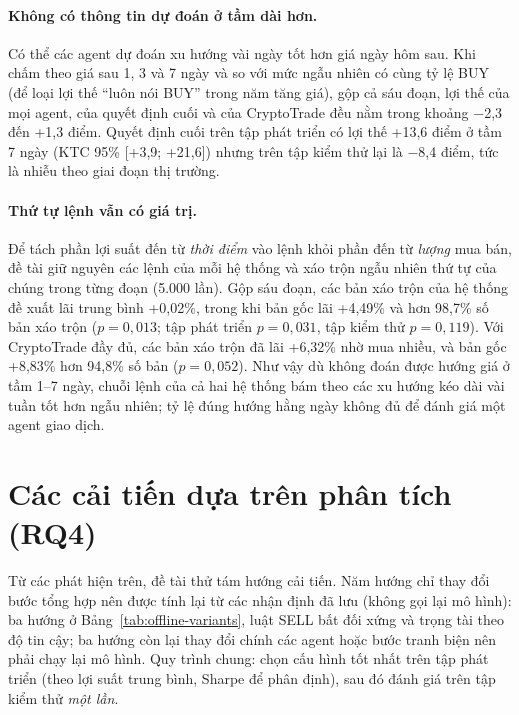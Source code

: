 \paragraph{Không có thông tin dự đoán ở tầm dài hơn.} Có thể các agent dự đoán xu hướng vài ngày tốt hơn giá ngày hôm
sau. Khi chấm theo giá sau 1, 3 và 7 ngày và so với mức ngẫu nhiên có cùng tỷ lệ BUY (để loại lợi thế ``luôn nói BUY''
trong năm tăng giá), gộp cả sáu đoạn, lợi thế của mọi agent, của quyết định cuối và của CryptoTrade đều nằm trong khoảng
$-$2,3 đến +1,3 điểm. Quyết định cuối trên tập phát triển có lợi thế +13,6 điểm ở tầm 7 ngày (KTC 95\% [+3,9; +21,6])
nhưng trên tập kiểm thử lại là $-$8,4 điểm, tức là nhiễu theo giai đoạn thị trường.

\paragraph{Thứ tự lệnh vẫn có giá trị.} Để tách phần lợi suất đến từ \emph{thời điểm} vào lệnh khỏi phần đến từ
\emph{lượng} mua bán, đề tài giữ nguyên các lệnh của mỗi hệ thống và xáo trộn ngẫu nhiên thứ tự của chúng trong từng
đoạn (5.000 lần). Gộp sáu đoạn, các bản xáo trộn của hệ thống đề xuất lãi trung bình +0,02\%, trong khi bản gốc lãi
+4,49\% và hơn 98,7\% số bản xáo trộn ($p=0{,}013$; tập phát triển $p=0{,}031$, tập kiểm thử $p=0{,}119$). Với
CryptoTrade đầy đủ, các bản xáo trộn đã lãi +6,32\% nhờ mua nhiều, và bản gốc +8,83\% hơn 94,8\% số bản ($p=0{,}052$).
Như vậy dù không đoán được hướng giá ở tầm 1--7 ngày, chuỗi lệnh của cả hai hệ thống bám theo các xu hướng kéo dài vài
tuần tốt hơn ngẫu nhiên; tỷ lệ đúng hướng hằng ngày không đủ để đánh giá một agent giao dịch.

\section{Các cải tiến dựa trên phân tích (RQ4)}
\label{sec:improve}
Từ các phát hiện trên, đề tài thử tám hướng cải tiến. Năm hướng chỉ thay đổi bước tổng hợp nên được tính lại từ các
nhận định đã lưu (không gọi lại mô hình): ba hướng ở Bảng~\ref{tab:offline-variants}, luật SELL bất đối xứng và trọng tài
theo độ tin cậy; ba hướng còn lại thay đổi chính các agent hoặc bước tranh biện nên phải chạy lại mô hình. Quy trình
chung: chọn cấu hình tốt nhất trên tập phát triển (theo lợi suất trung bình, Sharpe để phân định), sau đó đánh giá trên
tập kiểm thử \emph{một lần}.

